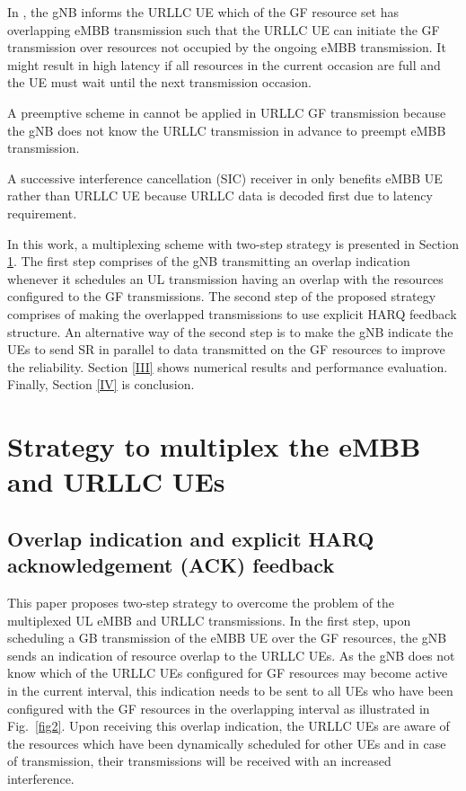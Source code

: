\documentclass[conference]{IEEEtran}
\begin{document}
In \cite{b9}, the gNB informs the URLLC UE which of the GF resource set has overlapping eMBB transmission such that the URLLC UE can initiate the GF transmission over resources not occupied by the ongoing eMBB transmission. It might result in high latency if all resources in the current occasion are full and the UE must wait until the next transmission occasion.

A preemptive scheme in \cite{b10} cannot be applied in URLLC GF transmission because the gNB does not know the URLLC transmission in advance to preempt eMBB transmission.

A successive interference cancellation (SIC) receiver in \cite{b11} only benefits eMBB UE rather than URLLC UE because URLLC data is decoded first due to latency requirement.

In this work, a multiplexing scheme with two-step strategy is presented in Section \ref{II}. The first step comprises of the gNB transmitting an overlap indication whenever it schedules an UL transmission having an overlap with the resources configured to the GF transmissions. The second step of the proposed strategy comprises of making the overlapped transmissions to use explicit HARQ feedback structure. An alternative way of the second step is to make the gNB indicate the UEs to send SR in parallel to data transmitted on the GF resources to improve the reliability. Section \ref{III} shows numerical results and performance evaluation. Finally, Section \ref{IV} is conclusion.

\section{Strategy to multiplex the eMBB and URLLC UEs}\label{II}

\subsection{Overlap indication and explicit HARQ acknowledgement (ACK) feedback}\label{IIAA}

This paper proposes two-step strategy to overcome the problem of the multiplexed UL eMBB and URLLC transmissions. In the first step, upon scheduling a GB transmission of the eMBB UE over the GF resources, the gNB sends an indication of resource overlap to the URLLC UEs. As the gNB does not know which of the URLLC UEs configured for GF resources may become active in the current interval, this indication needs to be sent to all UEs who have been configured with the GF resources in the overlapping interval as illustrated in Fig.~\ref{fig2}. Upon receiving this overlap indication, the URLLC UEs are aware of the resources which have been dynamically scheduled for other UEs and in case of transmission,  their transmissions will be received with an increased interference.
\end{document}
